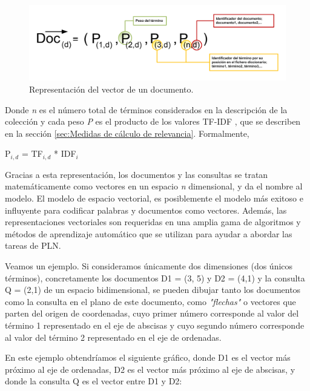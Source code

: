 \documentclass[titlepage]{article}
\begin{document}
\begin{figure}[h]
	\begin{center}
		\includegraphics*[scale=0.5]{formula_vector.png}
	\end{center}
	\caption{Representación del vector de un documento.}
	\label{fig: Figure 6}
\end{figure}

Donde \textit{n} es el número total de términos considerados en la descripción de la colección y cada peso \textit{P} es el producto de los valores TF-IDF \label{TF-IDF}, que se describen en la sección \ref{sec:Medidas de cálculo de relevancia}. Formalmente,

\begin{center}
	P$_{i, d}$ = TF$_{i, d}$ * IDF$_{i}$
\end{center}

Gracias a esta representación, los documentos y las consultas se tratan matemáticamente como vectores en un espacio \textit{n} dimensional, y da el nombre al modelo. El modelo de espacio vectorial, es posiblemente el modelo más exitoso e influyente para codificar palabras y documentos como vectores. Además, las representaciones vectoriales son requeridas en una amplia gama de algoritmos y métodos de aprendizaje automático que se utilizan para ayudar a abordar las tareas de PLN.

Veamos un ejemplo. Si consideramos únicamente dos dimensiones (dos únicos términos), concretamente los documentos D1 = (3, 5) y D2 = (4,1) y la consulta Q = (2,1) de un espacio bidimensional, se pueden dibujar tanto los documentos como la consulta en el plano de este documento, como \textit{"flechas"} o vectores que parten del origen de coordenadas, cuyo primer número corresponde al valor del término 1 representado en el eje de abscisas y cuyo segundo número corresponde al valor del término 2 representado en el eje de ordenadas. 

En este ejemplo obtendríamos el siguiente gráfico, donde D1 es el vector más próximo al eje de ordenadas, D2 es el vector más próximo al eje de abscisas, y donde la consulta Q es el vector entre D1 y D2:
\end{document}

